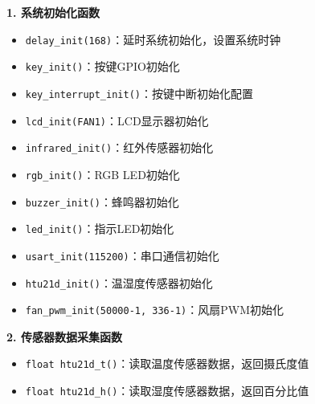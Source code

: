 \textbf{1. 系统初始化函数}
\begin{itemize}
    \vspace{-6pt}
  \item \texttt{delay\_init(168)}：延时系统初始化，设置系统时钟
    \vspace{-6pt}
  \item \texttt{key\_init()}：按键GPIO初始化
    \vspace{-6pt}
  \item \texttt{key\_interrupt\_init()}：按键中断初始化配置
    \vspace{-6pt}
  \item \texttt{lcd\_init(FAN1)}：LCD显示器初始化
    \vspace{-6pt}
  \item \texttt{infrared\_init()}：红外传感器初始化
    \vspace{-6pt}
  \item \texttt{rgb\_init()}：RGB LED初始化
    \vspace{-6pt}
  \item \texttt{buzzer\_init()}：蜂鸣器初始化
    \vspace{-6pt}
  \item \texttt{led\_init()}：指示LED初始化
    \vspace{-6pt}
  \item \texttt{usart\_init(115200)}：串口通信初始化
    \vspace{-6pt}
  \item \texttt{htu21d\_init()}：温湿度传感器初始化
    \vspace{-6pt}
  \item \texttt{fan\_pwm\_init(50000-1, 336-1)}：风扇PWM初始化
\end{itemize}

\textbf{2. 传感器数据采集函数}
\begin{itemize}
    \vspace{-6pt}
  \item \texttt{float htu21d\_t()}：读取温度传感器数据，返回摄氏度值
    \vspace{-6pt}
  \item \texttt{float htu21d\_h()}：读取湿度传感器数据，返回百分比值
\end{itemize}

